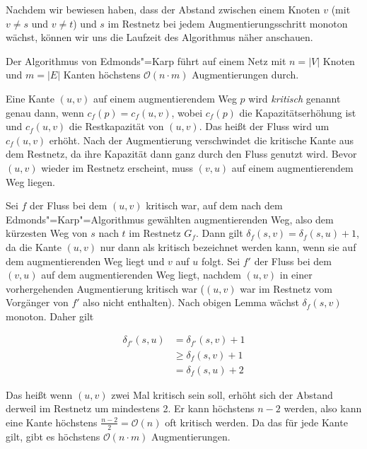 Nachdem wir bewiesen haben, dass der Abstand zwischen einem Knoten $v$ (mit $v \neq s$ und $v \neq t$) und $s$ im Restnetz bei jedem Augmentierungsschritt monoton wächst, können wir uns die Laufzeit des Algorithmus näher anschauen.

\begin{Lma}
  \hspace{\parindent}Der Algorithmus von Edmonds"=Karp führt auf einem Netz mit $n = |V|$ Knoten und $m = |E|$ Kanten höchstens $\mathcal{O}(n \cdot m)$ Augmentierungen durch.
\end{Lma}
\begin{Bew}
  \hspace{\parindent}Eine Kante $(u,v)$ auf einem augmentierendem Weg $p$ wird \textit{kritisch} genannt genau dann, wenn $c_f(p) = c_f(u,v)$, wobei $c_f(p)$ die Kapazitätserhöhung ist und $c_f(u,v)$ die Restkapazität von $(u,v)$. Das heißt der Fluss wird um $c_f(u,v)$ erhöht. Nach der Augmentierung verschwindet die kritische Kante aus dem Restnetz, da ihre Kapazität dann ganz durch den Fluss genutzt wird. Bevor $(u,v)$ wieder im Restnetz erscheint, muss $(v,u)$ auf einem augmentierendem Weg liegen.
  
  Sei $f$ der Fluss bei dem $(u,v)$ kritisch war, auf dem nach dem Edmonds"=Karp"=Algorithmus gewählten augmentierenden Weg, also dem kürzesten Weg von $s$ nach $t$ im Restnetz $G_f$. Dann gilt $\delta_f(s,v) = \delta_f(s,u) + 1$, da die Kante $(u,v)$ nur dann als kritisch bezeichnet werden kann, wenn sie auf dem augmentierenden Weg liegt und $v$ auf $u$ folgt. Sei $f'$ der Fluss bei dem $(v,u)$ auf dem augmentierenden Weg liegt, nachdem $(u,v)$ in einer vorhergehenden Augmentierung kritisch war ($(u,v)$ war im Restnetz vom Vorgänger von $f'$ also nicht enthalten). Nach obigen Lemma wächst $\delta_f(s,v)$ monoton. Daher gilt

  \begin{align*}
    \delta_{f'}(s, u) &= \delta_{f'}(s,v)+1\\
                      &\ge \delta_f(s,v) + 1\\
                      &= \delta_f(s,u) + 2
  \end{align*}
  
  Das heißt wenn $(u,v)$ zwei Mal kritisch sein soll, erhöht sich der Abstand derweil im Restnetz um mindestens 2. Er kann höchstens $n-2$ werden, also kann eine Kante höchstens $\frac{n-2}{2} = \mathcal{O}(n)$ oft kritisch werden. Da das für jede Kante gilt, gibt es höchstens $\mathcal{O}(n \cdot m)$ Augmentierungen.
\end{Bew}

